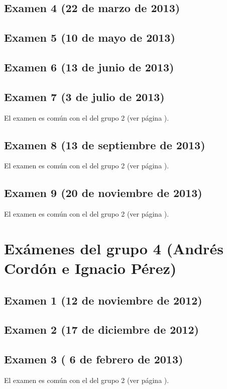 \documentclass[a4paper,12pt,twoside]{book}
\begin{document}
\subsection{Examen 4 (22 de marzo de 2013)}
\subsection{Examen 5 (10 de mayo de 2013)} 
\subsection{Examen 6 (13 de junio de 2013)} 
\subsection{Examen 7 (3 de julio de 2013)} 
El examen es común con el del grupo 2 (ver página \pageref{examen_12_13_2_7}).
\subsection{Examen 8 (13 de septiembre de 2013)} 
El examen es común con el del grupo 2 (ver página \pageref{examen_12_13_2_8}).
\subsection{Examen 9 (20 de noviembre de 2013)} 
El examen es común con el del grupo 2 (ver página \pageref{examen_12_13_2_9}).

\section{Exámenes del grupo 4 (Andrés Cordón e Ignacio Pérez)}
\subsection{Examen 1 (12 de noviembre de 2012)}
\subsection{Examen 2 (17 de diciembre de 2012)}
\subsection{Examen 3 ( 6 de febrero de 2013)}
El examen es común con el del grupo 2 (ver página \pageref{examen_12_13_2_3}).
\end{document}

